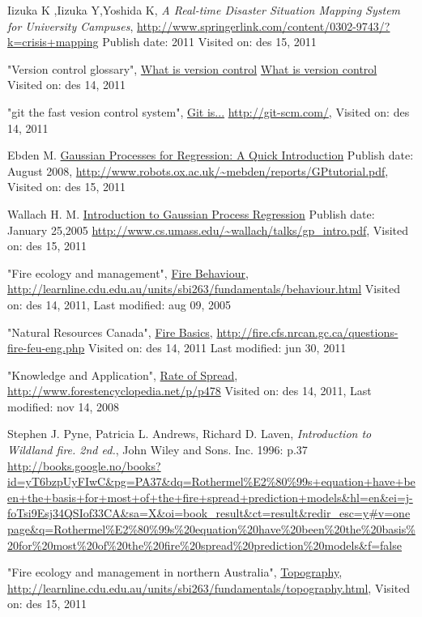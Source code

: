 \begin{thebibliography}{4}
 Iizuka K ,Iizuka Y,Yoshida K, \emph{A Real-time Disaster Situation Mapping System for University Campuses}, \url{http://www.springerlink.com/content/0302-9743/?k=crisis+mapping} Publish date: 2011 Visited on: des 15, 2011

 "Version control glossary", \underline{What is version control} \url{What is version control} Visited on: des 14, 2011

 "git the fast vesion control system", \underline{Git is...} \url{http://git-scm.com/}, Visited on: des 14, 2011

 Ebden M. \underline{Gaussian Processes for Regression: A Quick Introduction} Publish date: August 2008, \url{http://www.robots.ox.ac.uk/~mebden/reports/GPtutorial.pdf}, Visited on: des 15, 2011

 Wallach H. M. \underline{Introduction to Gaussian Process Regression}
Publish date: January 25,2005
\url{http://www.cs.umass.edu/~wallach/talks/gp_intro.pdf}, Visited on: des 15, 2011

 "Fire ecology and management", \underline{Fire Behaviour}, \url{http://learnline.cdu.edu.au/units/sbi263/fundamentals/behaviour.html}
Visited on: des 14, 2011, Last modified: aug 09, 2005

 "Natural Resources Canada", \underline{Fire Basics}, \url{http://fire.cfs.nrcan.gc.ca/questions-fire-feu-eng.php} Visited on: des 14, 2011
Last modified: jun 30, 2011

 "Knowledge and Application", \underline{Rate of Spread}, \url{http://www.forestencyclopedia.net/p/p478} Visited on: des 14, 2011, Last modified: nov 14, 2008

 Stephen J. Pyne, Patricia L. Andrews, Richard D. Laven, \emph{Introduction to Wildland fire. 2nd ed.}, John Wiley and Sons. Inc. 1996: p.37
\url{http://books.google.no/books?id=yT6bzpUyFIwC&pg=PA37&dq=Rothermel%E2%80%99s+equation+have+been+the+basis+for+most+of+the+fire+spread+prediction+models&hl=en&ei=j-foTsi9Esj34QSIof33CA&sa=X&oi=book_result&ct=result&redir_esc=y#v=onepage&q=Rothermel%E2%80%99s%20equation%20have%20been%20the%20basis%20for%20most%20of%20the%20fire%20spread%20prediction%20models&f=false}

 "Fire ecology and management in northern Australia", \underline{Topography}, \url{http://learnline.cdu.edu.au/units/sbi263/fundamentals/topography.html}, 
Visited on: des 15, 2011


\end{thebibliography}
